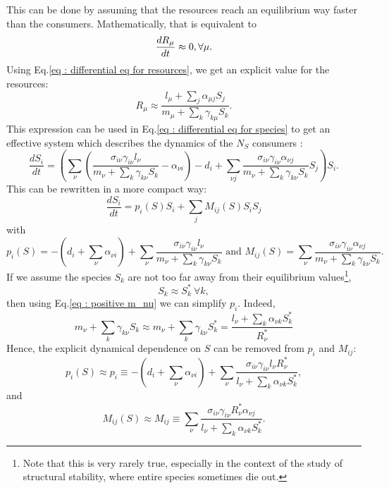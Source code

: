 \documentclass[12pt]{report}
\begin{document}
This can be done by assuming that the resources reach an equilibrium way faster than the consumers.
Mathematically, that is equivalent to
\begin{equation}
  \frac{dR_\mu}{dt} \approx 0, \\ \forall \mu.
\end{equation}
Using Eq.\eqref{eq : differential eq for resources}, we get an explicit value for the resources:
\begin{equation}
  R_\mu \approx \frac{l_\mu+\sum_j \alpha_{\mu j}S_j}{m_\mu + \sum_k \gamma_{k\mu}S_k}.
\end{equation}
This expression can be used in Eq.\eqref{eq : differential eq for species} to get an effective system which describes the dynamics of the $N_S$ consumers :
\begin{equation}
  \frac{dS_i}{dt} = \left(\sum_\nu \left(\frac{\sigma_{i\nu}\gamma_{i\nu}l_\nu}{m_\nu+\sum_k \gamma_{k\nu}S_k} - \alpha_{\nu i}\right) -d_i + \sum_{\nu j} \frac{\sigma_{i\nu}\gamma_{i\nu}\alpha_{\nu j}}{m_\nu+\sum_{k}\gamma_{k\nu}S_k}S_j \right) S_i.
\end{equation}
This can be rewritten in a more compact way:
\begin{equation}
  \frac{dS_i}{dt} = p_i(S) S_i + \sum_j M_{ij}(S)S_i S_j \label{eq : effective equations of evolution}
\end{equation}
with
\begin{equation}
    p_i(S) = -\left(d_i+\sum_{\nu}\alpha_{\nu i}\right) + \sum_\nu \frac{\sigma_{i\nu}\gamma_{i\nu}l_\nu}{m_\nu+\sum_k \gamma_{k\nu}S_k}\text{ and } M_{ij}(S)=\sum_{\nu}\frac{\sigma_{i\nu}\gamma_{i\nu}\alpha_{\nu j}}{m_\nu+\sum_{k}\gamma_{k\nu}S_k}.
\end{equation}
If we assume the species $S_k$ are not too far away from their equilibrium values\footnote{Note that this is very rarely true, especially in the context of the study of structural stability, where entire species sometimes die out.}, \ie
\begin{equation}
S_k \approx S^*_k \ \forall k,
\end{equation}
then using Eq.\eqref{eq : positive m_nu} we can simplify $p_i$. Indeed,
\begin{equation}
m_\nu + \sum_k \gamma_{k\nu} S_k \approx m_\nu + \sum_k \gamma_{k\nu}S^*_k = \frac{l_\nu + \sum_k \alpha_{\nu k}S^*_k}{R^*_\nu} \label{eq : equality fluxes resource}
\end{equation}
Hence, the explicit dynamical dependence on $S$ can be removed from $p_i$ and $M_{ij}$:
\begin{equation}
p_i(S) \approx p_i \equiv - \left(d_i + \sum_\nu \alpha_{\nu i}\right) + \sum_\nu \frac{\sigma_{i\nu}\gamma_{i\nu}l_\nu R^*_\nu}{l_\nu + \sum_k \alpha_{\nu k}S^*_k},
\end{equation} and
\begin{equation}
M_{ij}(S) \approx M_{ij} \equiv \sum_\nu \frac{\sigma_{i\nu} \gamma_{i\nu} R^*_\nu \alpha_{\nu j}}{l_\nu + \sum_k{\alpha_{\nu k} S^*_k}}.
\end{equation}
\end{document}
